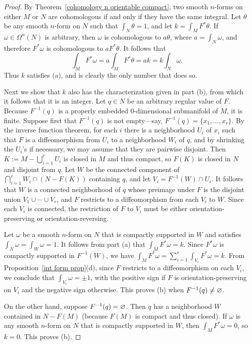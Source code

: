 \begin{proof}
By Theorem~\ref{cohomology n orientable compact}, two smooth $n$-forms on either $M$ or $N$ are cohomologous if and only if they have the same integral. Let $\theta$ be any smooth $n$-form on $N$ such that $\int_N\theta=1$, and let $k=\int_MF^*\theta$. If $\omega\in\Omega^n(N)$ is arbitrary, then $\omega$ is cohomologous to $a\theta$, where $a=\int_N\omega$, and therefore $F^*\omega$ is cohomologous to $aF^*\theta$. It follows that
\[\int_MF^*\omega=a\int_MF^*\theta=ak=k\int_N\omega.\]
Thus $k$ satisfies (a), and is clearly the only number that does so.\par
Next we show that $k$ also has the characterization given in part (b), from which it follows that it is an integer. Let $q\in N$ be an arbitrary regular value of $F$. Because $F^{-1}(q)$ is a properly embedded $0$-dimensional submanifold of $M$, it is finite. Suppose first that $F^{-1}(q)$ is not empty---say, $F^{-1}(q)=\{x_1,\dots,x_r\}$. By the inverse function theorem, for each $i$ there is a neighborhood $U_i$ of $x_i$ such that $F$ is a diffeomorphism from $U_i$ to a neighborhood $W_i$ of $q$, and by shrinking the $U_i$'s if necessary, we may assume that they are pairwise disjoint. Then $K:=M-\bigcup_{i=1}^{r}U_i$ is closed in $M$ and thus compact, so $F(K)$ is closed in $N$ and disjoint from $q$. Let $W$ be the connected component of $\bigcap_{i=1}^{r}W_i\cap(N-F(K))$ containing $q$, and let $V_i=F^{-1}(W)\cap U_i$. It follows that $W$ is a connected neighborhood of $q$ whose preimage under $F$ is the disjoint union $V_1\cup\cdots\cup V_r$, and $F$ restricts to a diffeomorphism from each $V_i$ to $W$. Since each $V_i$ is connected, the restriction of $F$ to $V_i$ must be either orientation-preserving or orientation-reversing.\par
Let $\omega$ be a smooth $n$-form on $N$ that is compactly supported in $W$ and satisfies $\int_N\omega=\int_W\omega=1$. It follows from part (a) that $\int_MF^*\omega=k$. Since $F^*\omega$ is compactly supported in $F^{-1}(W)$, we have $\int_MF^*\omega=\sum_{i=1}^{r}\int_{V_i}F^*\omega=k$. From Proposition~\ref{int form prop}(d), since $F$ restricts to a diffeomorphism on each $V_i$, we conclude that $\int_{V_i}\omega=\pm 1$, with the positive sign if $F$ is orientation-preserving on $V_i$ and the negative sign otherwise. This proves (b) when $F^{-1}(q)\neq\varnothing$.\par
On the other hand, suppose $F^{-1}(q)=\varnothing$. Then $q$ has a neighborhood $W$ contained in $N-F(M)$ (because $F(M)$ is compact and thus closed). If $\omega$ is any smooth $n$-form on $N$ that is compactly supported in $W$, then $\int_MF^*\omega=0$, so $k=0$. This proves (b).
\end{proof}
